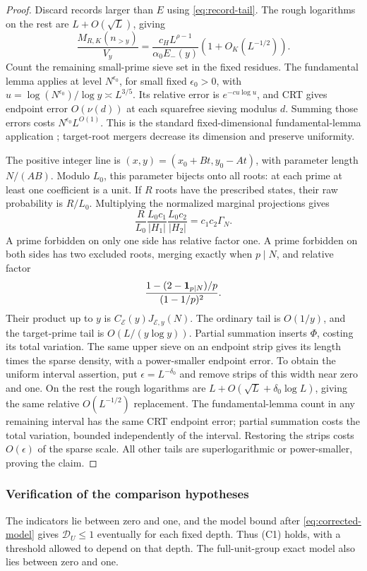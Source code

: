 \begin{proof}
Discard records larger than \(E\) using \eqref{eq:record-tail}.
The rough logarithms on the rest are \(L+O(\sqrt L)\), giving
\[
 \frac{M_{R,K}(n_{>y})}{V_y}
 =\frac{c_H L^{\rho-1}}{\alpha_0E_-(y)}(1+O_K(L^{-1/2})).
\]
Count the remaining small-prime sieve set in the fixed residues.
The fundamental lemma applies at level \(N^{\epsilon_0}\), for
small fixed \(\epsilon_0>0\), with
\(u=\log(N^{\epsilon_0})/\log y\asymp L^{3/5}\).
Its relative error is \(e^{-cu\log u}\), and CRT gives endpoint
error \(O(\nu(d))\) at each squarefree sieving modulus \(d\).
Summing those errors costs \(N^{\epsilon_0}L^{O(1)}\).
This is the standard fixed-dimensional fundamental-lemma application
\cite[Theorem 11.7]{richert}; target-root mergers
decrease its dimension and preserve uniformity.

The positive integer line is \((x,y)=(x_0+Bt,y_0-At)\), with
parameter length \(N/(AB)\). Modulo \(L_0\), this parameter bijects
onto all roots: at each prime at least one coefficient is a unit.
If \(R\) roots have the prescribed states, their raw probability is
\(R/L_0\). Multiplying the normalized marginal projections gives
\[
 \frac{R}{L_0}\frac{L_0c_1}{|H_1|}\frac{L_0c_2}{|H_2|}
       =c_1c_2\Gamma_N.
\]
A prime forbidden on only one side has relative factor one.
A prime forbidden on both sides has two excluded roots, merging
exactly when \(p\mid N\), and relative factor
\[
 \frac{1-(2-\mathbf 1_{p\mid N})/p}{(1-1/p)^2}.
\]
Their product up to \(y\) is
\(C_{\mathcal E}(y)J_{\mathcal E,y}(N)\). The ordinary tail is
\(O(1/y)\), and the target-prime tail is \(O(L/(y\log y))\).
Partial summation inserts \(\Phi\), costing its total variation.
The same upper sieve on an endpoint strip gives its length times
the sparse density, with a power-smaller endpoint error.
To obtain the uniform interval assertion, put
\(\epsilon=L^{-\delta_0}\) and remove strips of this width near
zero and one. On the rest the rough logarithms are
\(L+O(\sqrt L+\delta_0\log L)\), giving the same relative
\(O(L^{-1/2})\) replacement. The fundamental-lemma count in any
remaining interval has the same CRT endpoint error; partial summation
costs the total variation, bounded independently of the interval.
Restoring the strips costs \(O(\epsilon)\) of the sparse scale.
All other tails are superlogarithmic or power-smaller, proving the claim.
\end{proof}

\subsubsection{Verification of the comparison hypotheses}
The indicators lie between zero and one, and the model bound after
\eqref{eq:corrected-model} gives \(\mathcal D_U\le1\) eventually for each
fixed depth. Thus (C1) holds, with a threshold allowed to depend on
that depth. The full-unit-group exact model also lies between zero
and one.

